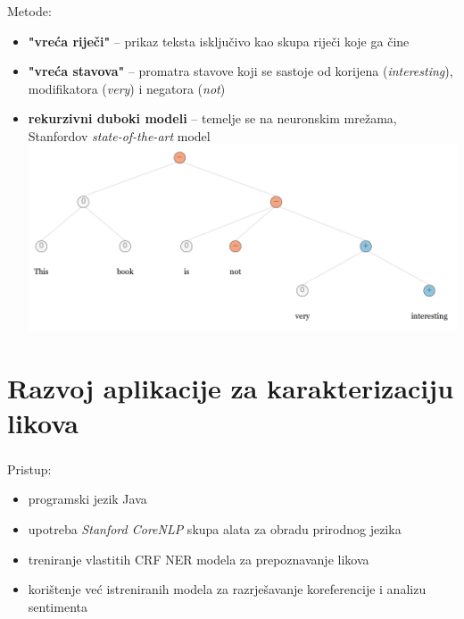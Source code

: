 \documentclass[t, xcolor={usenames,dvipsnames,svgnames,table}]{beamer}
\begin{document}
	\begin{frame}
		\frametitle{\secname}
		
		Metode:
		\begin{itemize}
			\item 	\textbf{"vreća riječi"} -- prikaz teksta isključivo kao skupa riječi koje ga čine
			
			\item 	\textbf{"vreća stavova"} -- promatra stavove koji se sastoje od korijena (\textit{interesting}), modifikatora (\textit{very}) i negatora (\textit{not})
			
			\item	\textbf{rekurzivni duboki modeli} -- temelje se na neuronskim mrežama, Stanfordov \textit{state-of-the-art} model \\
			\includegraphics[scale = 0.35]{sentiment_treebank.png}
			
		\end{itemize}
		
	\end{frame}

\section{Razvoj aplikacije za karakterizaciju likova}
	
	\begin{frame}
		\sectionpage
	\end{frame}
	
	\begin{frame}
		\frametitle{\secname}
		
		Pristup:
		\begin{itemize}
			\item	programski jezik Java
			\item	upotreba \textit{Stanford CoreNLP} skupa alata za obradu prirodnog jezika
			\item 	treniranje vlastitih CRF NER modela za prepoznavanje likova
			\item 	korištenje već istreniranih modela za razrješavanje koreferencije i analizu sentimenta
		\end{itemize}
	\end{frame}
	
\end{document}
